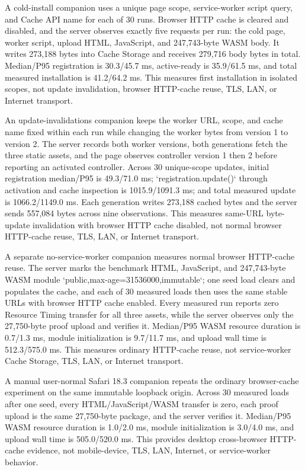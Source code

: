\documentclass[11pt]{article}
\begin{document}
A cold-install companion uses a unique page scope, service-worker script query, and Cache API name for each of 30 runs. Browser HTTP cache is cleared and disabled, and the server observes exactly five requests per run: the cold page, worker script, upload HTML, JavaScript, and 247,743-byte WASM body. It writes 273,188 bytes into Cache Storage and receives 279,716 body bytes in total. Median/P95 registration is 30.3/45.7 ms, active-ready is 35.9/61.5 ms, and total measured installation is 41.2/64.2 ms. This measures first installation in isolated scopes, not update invalidation, browser HTTP-cache reuse, TLS, LAN, or Internet transport.

An update-invalidations companion keeps the worker URL, scope, and cache name fixed within each run while changing the worker bytes from version 1 to version 2. The server records both worker versions, both generations fetch the three static assets, and the page observes controller version 1 then 2 before reporting an activated controller. Across 30 unique-scope updates, initial registration median/P95 is 49.3/71.0 ms; `registration.update()` through activation and cache inspection is 1015.9/1091.3 ms; and total measured update is 1066.2/1149.0 ms. Each generation writes 273,188 cached bytes and the server sends 557,084 bytes across nine observations. This measures same-URL byte-update invalidation with browser HTTP cache disabled, not normal browser HTTP-cache reuse, TLS, LAN, or Internet transport.

A separate no-service-worker companion measures normal browser HTTP-cache reuse. The server marks the benchmark HTML, JavaScript, and 247,743-byte WASM module `public,max-age=31536000,immutable`; one seed load clears and populates the cache, and each of 30 measured loads then uses the same stable URLs with browser HTTP cache enabled. Every measured run reports zero Resource Timing transfer for all three assets, while the server observes only the 27,750-byte proof upload and verifies it. Median/P95 WASM resource duration is 0.7/1.3 ms, module initialization is 9.7/11.7 ms, and upload wall time is 512.3/575.0 ms. This measures ordinary HTTP-cache reuse, not service-worker Cache Storage, TLS, LAN, or Internet transport.

A manual user-normal Safari 18.3 companion repeats the ordinary browser-cache experiment on the same immutable loopback origin. Across 30 measured loads after one seed, every HTML/JavaScript/WASM transfer is zero, each proof upload is the same 27,750-byte package, and the server verifies it. Median/P95 WASM resource duration is 1.0/2.0 ms, module initialization is 3.0/4.0 ms, and upload wall time is 505.0/520.0 ms. This provides desktop cross-browser HTTP-cache evidence, not mobile-device, TLS, LAN, Internet, or service-worker behavior.
\end{document}
